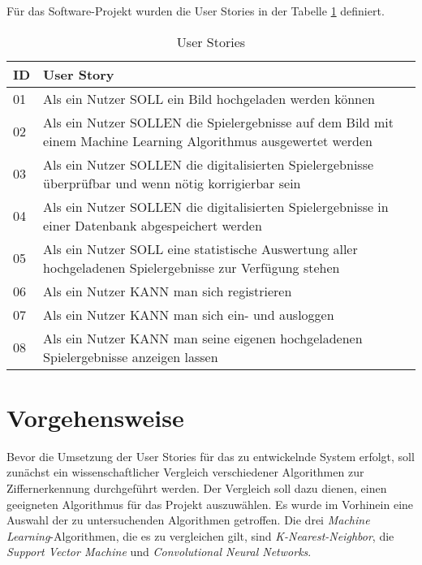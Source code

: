 Für das Software-Projekt wurden die User Stories in der Tabelle \ref{table:user_stories} definiert.
\begin{table}[]
    \begin{tabular}{m{2.5cm}|m{12cm}}
    \textbf{ID} & \textbf{User Story}                                                                                              \\ \hline
    01          & Als ein Nutzer SOLL ein Bild hochgeladen werden können                                                           \\
    02          & Als ein Nutzer SOLLEN die Spielergebnisse auf dem Bild mit einem Machine Learning Algorithmus ausgewertet werden \\
    03          & Als ein Nutzer SOLLEN die digitalisierten Spielergebnisse überprüfbar und wenn nötig korrigierbar sein           \\
    04          & Als ein Nutzer SOLLEN die digitalisierten Spielergebnisse in einer Datenbank abgespeichert werden                \\
    05          & Als ein Nutzer SOLL eine statistische Auswertung aller hochgeladenen Spielergebnisse zur Verfügung stehen        \\
    06          & Als ein Nutzer KANN man sich registrieren                                                                        \\
    07          & Als ein Nutzer KANN man sich ein- und ausloggen                                                                  \\
    08          & Als ein Nutzer KANN man seine eigenen hochgeladenen Spielergebnisse anzeigen lassen                             
    \end{tabular}
    \caption{User Stories}
    \label{table:user_stories}
\end{table}

\section{Vorgehensweise}
Bevor die Umsetzung der User Stories für das zu entwickelnde System erfolgt, soll zunächst ein wissenschaftlicher Vergleich verschiedener Algorithmen zur Ziffernerkennung durchgeführt werden. Der Vergleich soll dazu dienen, einen geeigneten Algorithmus für das Projekt auszuwählen. Es wurde im Vorhinein eine Auswahl der zu untersuchenden Algorithmen getroffen. Die drei \textit{Machine Learning}-Algorithmen, die es zu vergleichen gilt, sind \textit{K-Nearest-Neighbor}, die \textit{Support Vector Machine} und \textit{Convolutional Neural Networks}.

